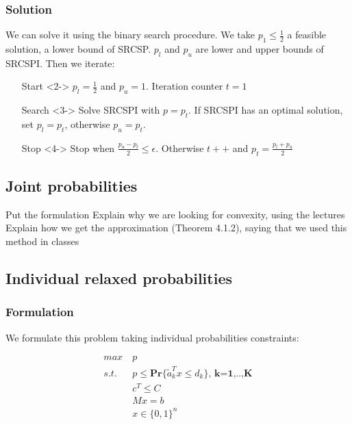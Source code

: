 \documentclass{beamer}
\begin{document}
\subsubsection{Solution}
\begin{frame}
We can solve it using the binary search procedure. We take $p_1 \leq \frac{1}{2}$ a feasible solution, a lower bound of SRCSP. $p_l$ and $p_u$ are lower and upper bounds of SRCSPI. Then we iterate:

\begin{itemize}
\item[Start]<2-> $p_l = \frac{1}{2}$ and $p_u = 1$. Iteration counter $t = 1$
\item[Search]<3-> Solve SRCSPI with $p = p_t$. If SRCSPI has an optimal solution, set $p_l = p_t$, otherwise $p_u = p_t$.
\item[Stop]<4-> Stop when $\frac{p_u - p_l}{2} \leq \epsilon$. Otherwise $t++$ and $p_t = \frac{p_l + p_u}{2} $
\end{itemize}

\end{frame}

\subsection{Joint probabilities}
\begin{frame}
Put the formulation
Explain why we are looking for convexity, using the lectures
Explain how we get the approximation (Theorem 4.1.2), saying that we used this method in classes

\end{frame}

\subsection{Individual relaxed probabilities}
\subsubsection{Formulation}
\begin{frame}
	We formulate this problem taking individual probabilities constraints:
	
\begin{align*}
 max\ & p\\
 s.t.\ & p \leq \mathbf{Pr} \{ \tilde{a}_k^Tx \leq d_k \}\textbf{,\ k=1,..,K} \\
 & c^T \leq C \\
 & Mx = b \\
 & x \in \{0, 1\}^n
\end{align*}
\end{frame}
\end{document}
